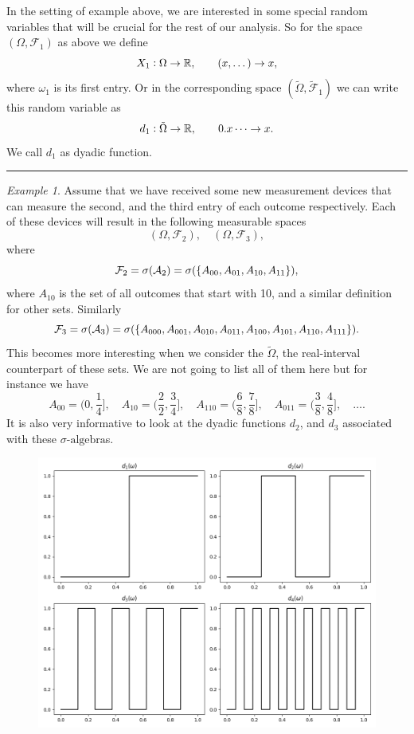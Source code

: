 \documentclass[11pt,a4paper]{article}
\theoremstyle{definition}
\theoremstyle{remark}
\newtheorem{example}{Example}
\begin{document}
	In the setting of example above, we are interested in some special random variables that will be crucial for the rest of our analysis. So for the space $ (\Omega,\mathcal{F}_1) $ as above we define
	\[ X_1: \Omega \to \mathbb{R}, \qquad (x,\dots) \to x, \]
	where $ \omega_1 $ is its first entry. Or in the corresponding space $ (\tilde\Omega, \tilde{\mathcal{F}}_1)$ we can write this random variable as
	\[ d_1: \tilde\Omega \to \mathbb{R}, \qquad 0.x\dots \to x. \]
	We call $ d_1 $ as dyadic function.
	
	
	\vspace{5pt}
	\hrule
	\begin{example}
		Assume that we have received some new measurement devices that can measure the second, and the third entry of each outcome respectively. Each of these devices will result in the following measurable spaces
		\[ (\Omega, \mathcal{F}_2),\quad (\Omega, \mathcal{F}_3), \]
		where 
		\[ \mathcal{F}_2 = \sigma(\mathcal{A}_2) = \sigma(\{A_{00},A_{01},A_{10},A_{11}\}), \]
		where $ A_{10} $ is the set of all outcomes that start with 10, and a similar definition for other sets. Similarly
		\[ \mathcal{F}_3 = \sigma(\mathcal{A}_3) = \sigma(\{A_{000},A_{001},A_{010},A_{011},A_{100},A_{101},A_{110},A_{111}\}). \]
		This becomes more interesting when we consider the $ \tilde\Omega $, the real-interval counterpart of these sets. We are not going to list all of them here but for instance we have
		\[ A_{00} = (0,\frac{1}{4}], \quad A_{10}=(\frac{2}{2},\frac{3}{4}], \quad A_{110}=(\frac{6}{8},\frac{7}{8}], \quad A_{011} = (\frac{3}{8},\frac{4}{8}], \quad \dots. \]
		It is also very informative to look at the dyadic functions $ d_2 $, and $ d_3 $ associated with these $\sigma\text{-algebra}$s.
		
		\begin{figure}[h!]
			\centering
			\includegraphics[width=0.5\linewidth]{Images/components}
			\label{fig:components}
		\end{figure}
		\FloatBarrier
		

\end{example}
\end{document}
